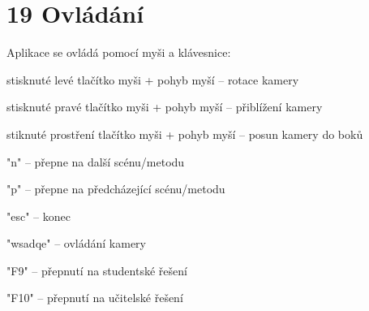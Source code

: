 \chapter{19 Ovládání}
\hypertarget{p19_ovladani}{}\label{p19_ovladani}
Aplikace se ovládá pomocí myši a klávesnice\+:
\begin{DoxyItemize}
\item stisknuté levé tlačítko myši + pohyb myší -- rotace kamery
\item stisknuté pravé tlačítko myši + pohyb myší -- přiblížení kamery
\item stiknuté prostření tlačítko myši + pohyb myší -- posun kamery do boků
\item "{}n"{} -- přepne na další scénu/metodu
\item "{}p"{} -- přepne na předcházející scénu/metodu
\item "{}esc"{} -- konec
\item "{}wsadqe"{} -- ovládání kamery
\item "{}\+F9"{} -- přepnutí na studentské řešení
\item "{}\+F10"{} -- přepnutí na učitelské řešení 
\end{DoxyItemize}